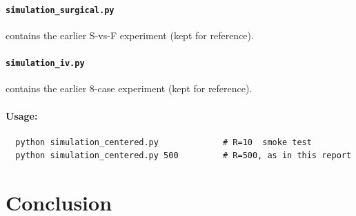 \documentclass[11pt,letterpaper]{article}
\begin{document}
\paragraph{\texttt{simulation\_surgical.py}} contains the earlier S-vs-F
experiment (kept for reference).

\paragraph{\texttt{simulation\_iv.py}} contains the earlier 8-case
experiment (kept for reference).

\paragraph{Usage:}
\begin{verbatim}
  python simulation_centered.py             # R=10  smoke test
  python simulation_centered.py 500         # R=500, as in this report
\end{verbatim}


\section{Conclusion}
\end{document}
